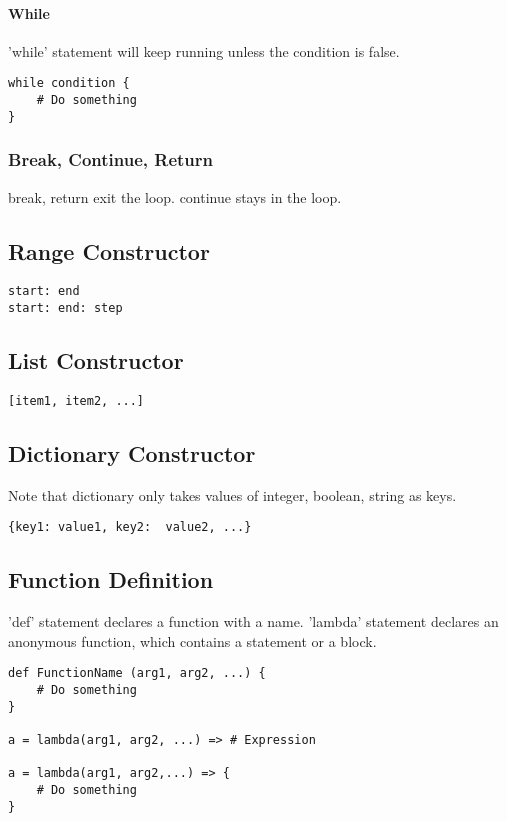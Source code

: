 \documentclass[]{article}
\begin{document}
\paragraph{While}
'while' statement will keep running unless the condition is false.

\begin{lstlisting}
while condition {
	# Do something
}
\end{lstlisting}

\subsubsection{Break, Continue, Return}

break, return exit the loop. continue stays in the loop.

\subsection{Range Constructor}

\begin{lstlisting}
start: end
start: end: step
\end{lstlisting}

\subsection{List Constructor}
\begin{lstlisting}
[item1, item2, ...]
\end{lstlisting}


\subsection{Dictionary Constructor}
Note that dictionary only takes values of integer, boolean, string as keys.
\begin{lstlisting}
{key1: value1, key2:  value2, ...}
\end{lstlisting}

\subsection{Function Definition}
'def' statement declares a function with a name.
'lambda' statement declares an anonymous function, which contains a statement or a block.

\begin{lstlisting}
def FunctionName (arg1, arg2, ...) {
	# Do something	
}

a = lambda(arg1, arg2, ...) => # Expression

a = lambda(arg1, arg2,...) => {
	# Do something
}
\end{lstlisting}
\end{document}
